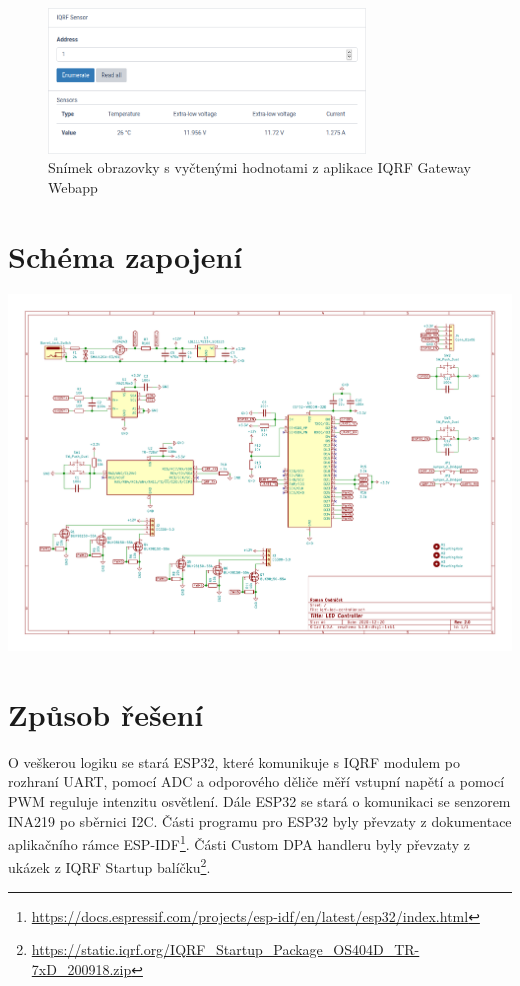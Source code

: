 \documentclass[12pt]{article}
\begin{document}
	\begin{figure}[!ht]
      	\centering
        \includegraphics[width = 0.75\textwidth]{img/iqrf-gateway-webapp.png}
        \caption{Snímek obrazovky s vyčtenými hodnotami z aplikace IQRF Gateway Webapp}
      \end{figure}

	\section{Schéma zapojení}	
	
	\includegraphics[scale=0.79,angle=90]{img/schema.pdf}	
	
	\section{Způsob řešení}	
	
	O veškerou logiku se stará ESP32, které komunikuje s IQRF modulem po rozhraní UART, pomocí ADC a odporového děliče měří vstupní napětí a pomocí PWM reguluje intenzitu osvětlení. Dále ESP32 se stará o komunikaci se senzorem INA219 po sběrnici I2C. Části programu pro ESP32 byly převzaty z dokumentace aplikačního rámce ESP-IDF\footnote{\url{https://docs.espressif.com/projects/esp-idf/en/latest/esp32/index.html}}. Části Custom DPA handleru byly převzaty z ukázek z IQRF Startup balíčku\footnote{\url{https://static.iqrf.org/IQRF_Startup_Package_OS404D_TR-7xD_200918.zip}}.
	
\end{document}
